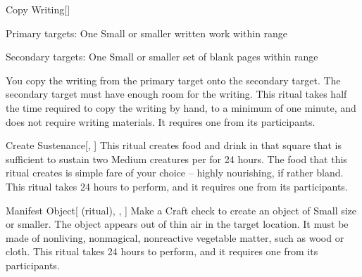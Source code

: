 \lowercase{\hypertarget{spell:Copy Writing}{}}\label{spell:Copy Writing}
\begin{freeability}[Rank 1]{\hypertarget{spell:Copy Writing}{Copy Writing}}[]

Primary targets: One Small or smaller written work within \rngclose range
\par\noindent
Secondary targets: One Small or smaller set of blank pages within \rngclose range

You copy the writing from the primary target onto the secondary target.
The secondary target must have enough room for the writing.
This ritual takes half the time required to copy the writing by hand, to a minimum of one minute, and does not require writing materials.
It requires one  from its participants.

\end{freeability}
\vspace{0.25em}



\lowercase{\hypertarget{spell:Create Sustenance}{}}\label{spell:Create Sustenance}
\begin{freeability}[Rank 3]{\hypertarget{spell:Create Sustenance}{Create Sustenance}}[, ]
This ritual creates food and drink in that square that is sufficient to sustain two Medium creatures per  for 24 hours.
The food that this ritual creates is simple fare of your choice -- highly nourishing, if rather bland.
This ritual takes 24 hours to perform, and it requires one  from its participants.
\end{freeability}
\vspace{0.25em}



\lowercase{\hypertarget{spell:Manifest Object}{}}\label{spell:Manifest Object}
\begin{attuneability}[Rank 3]{\hypertarget{spell:Manifest Object}{Manifest Object}}[ (ritual), , ]
Make a Craft check to create an object of Small size or smaller.
The object appears out of thin air in the target location.
It must be made of nonliving, nonmagical, nonreactive vegetable matter, such as wood or cloth.
This ritual takes 24 hours to perform, and it requires one  from its participants.
\end{attuneability}
\vspace{0.25em}



